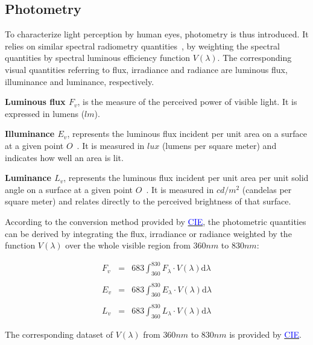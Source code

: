 \subsection{Photometry}
To characterize light perception by human eyes, photometry is thus introduced.
It relies on similar spectral radiometry quantities~\cite{2022_Hebert}, by weighting the spectral quantities by spectral luminous efficiency function $V(\lambda)$.
The corresponding visual quantities referring to flux, irradiance and radiance are luminous flux, illuminance and luminance, respectively.

\textbf{Luminous flux $F_v$}, is the measure of the perceived power of visible light. 
It is expressed in lumens ($lm$). 


\textbf{Illuminance $E_v$}, represents the luminous flux incident per unit area on a surface at a given point $O$~\cite{1993_Ian}.
It is measured in $lux$ (lumens per square meter) and indicates how well an area is lit.

\textbf{Luminance $L_v$}, represents the luminous flux incident per unit area per unit solid angle on a surface at a given point $O$~\cite{1993_Ian}. 
It is measured in $cd/m^2$ (candelas per square meter) and relates directly to the perceived brightness of that surface.

According to the conversion method provided by \href{https://doi.org/10.25039/CIE.DS.dktna2s3}{\textcolor{blue}{CIE}}, the photometric quantities can be derived by integrating the flux, irradiance or radiance weighted by the function $V(\lambda)$ over the whole visible region from $360nm$ to $830nm$:

\begin{equation}
    \label{eq: transform_irrad_illum}
    \begin{array}{lll}
    F_{v} & = & \displaystyle{683\int_{360}^{830} F_\lambda \cdot V(\lambda) \mathrm{d}\lambda} \\ \\
    E_{v} & = & \displaystyle{683\int_{360}^{830} E_\lambda \cdot V(\lambda) \mathrm{d}\lambda} \\ \\
    L_{v} & = & \displaystyle{683 \int_{360}^{830}L_\lambda \cdot V(\lambda) \mathrm{d}\lambda}
    \end{array}
\end{equation}

The corresponding dataset of $V(\lambda)$ from $360 nm$ to $830 nm$ is provided by \href{https://doi.org/10.25039/CIE.DS.dktna2s3}{\textcolor{blue}{CIE}}.

